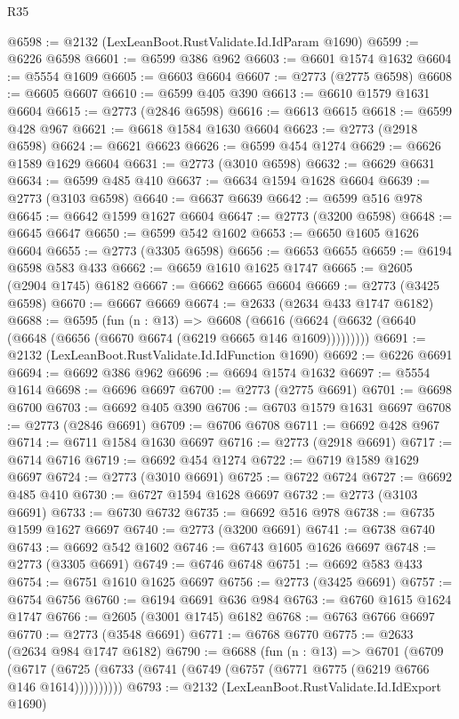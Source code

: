 \begin{lexlean}{R35}
\begin{coremodule}
@6598 := @2132 (LexLeanBoot.RustValidate.Id.IdParam @1690)
@6599 := @6226 @6598
@6601 := @6599 @386 @962
@6603 := @6601 @1574 @1632
@6604 := @5554 @1609
@6605 := @6603 @6604
@6607 := @2773 (@2775 @6598)
@6608 := @6605 @6607
@6610 := @6599 @405 @390
@6613 := @6610 @1579 @1631 @6604
@6615 := @2773 (@2846 @6598)
@6616 := @6613 @6615
@6618 := @6599 @428 @967
@6621 := @6618 @1584 @1630 @6604
@6623 := @2773 (@2918 @6598)
@6624 := @6621 @6623
@6626 := @6599 @454 @1274
@6629 := @6626 @1589 @1629 @6604
@6631 := @2773 (@3010 @6598)
@6632 := @6629 @6631
@6634 := @6599 @485 @410
@6637 := @6634 @1594 @1628 @6604
@6639 := @2773 (@3103 @6598)
@6640 := @6637 @6639
@6642 := @6599 @516 @978
@6645 := @6642 @1599 @1627 @6604
@6647 := @2773 (@3200 @6598)
@6648 := @6645 @6647
@6650 := @6599 @542 @1602
@6653 := @6650 @1605 @1626 @6604
@6655 := @2773 (@3305 @6598)
@6656 := @6653 @6655
@6659 := @6194 @6598 @583 @433
@6662 := @6659 @1610 @1625 @1747
@6665 := @2605 (@2904 @1745) @6182
@6667 := @6662 @6665 @6604
@6669 := @2773 (@3425 @6598)
@6670 := @6667 @6669
@6674 := @2633 (@2634 @433 @1747 @6182)
@6688 := @6595
    (fun (n : @13) =>
    @6608 (@6616 (@6624 (@6632 (@6640 (@6648 (@6656 (@6670 @6674 (@6219 @6665 @146 @1609)))))))))
@6691 := @2132 (LexLeanBoot.RustValidate.Id.IdFunction @1690)
@6692 := @6226 @6691
@6694 := @6692 @386 @962
@6696 := @6694 @1574 @1632
@6697 := @5554 @1614
@6698 := @6696 @6697
@6700 := @2773 (@2775 @6691)
@6701 := @6698 @6700
@6703 := @6692 @405 @390
@6706 := @6703 @1579 @1631 @6697
@6708 := @2773 (@2846 @6691)
@6709 := @6706 @6708
@6711 := @6692 @428 @967
@6714 := @6711 @1584 @1630 @6697
@6716 := @2773 (@2918 @6691)
@6717 := @6714 @6716
@6719 := @6692 @454 @1274
@6722 := @6719 @1589 @1629 @6697
@6724 := @2773 (@3010 @6691)
@6725 := @6722 @6724
@6727 := @6692 @485 @410
@6730 := @6727 @1594 @1628 @6697
@6732 := @2773 (@3103 @6691)
@6733 := @6730 @6732
@6735 := @6692 @516 @978
@6738 := @6735 @1599 @1627 @6697
@6740 := @2773 (@3200 @6691)
@6741 := @6738 @6740
@6743 := @6692 @542 @1602
@6746 := @6743 @1605 @1626 @6697
@6748 := @2773 (@3305 @6691)
@6749 := @6746 @6748
@6751 := @6692 @583 @433
@6754 := @6751 @1610 @1625 @6697
@6756 := @2773 (@3425 @6691)
@6757 := @6754 @6756
@6760 := @6194 @6691 @636 @984
@6763 := @6760 @1615 @1624 @1747
@6766 := @2605 (@3001 @1745) @6182
@6768 := @6763 @6766 @6697
@6770 := @2773 (@3548 @6691)
@6771 := @6768 @6770
@6775 := @2633 (@2634 @984 @1747 @6182)
@6790 := @6688
    (fun (n : @13) =>
    @6701
      (@6709
        (@6717 (@6725 (@6733 (@6741 (@6749 (@6757 (@6771 @6775 (@6219 @6766 @146 @1614))))))))))
@6793 := @2132 (LexLeanBoot.RustValidate.Id.IdExport @1690)

\end{coremodule}
\end{lexlean}
